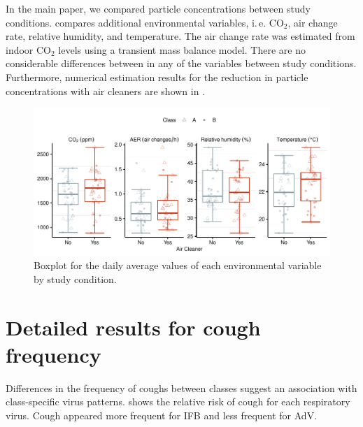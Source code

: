 \documentclass[fleqn,11pt]{wlscirep_supp}
\newcommand\ie{i.\,e.\xspace}
\begin{document}
In the main paper, we compared particle concentrations between study conditions.  compares additional environmental variables, \ie CO$_2$, air change rate, relative humidity, and temperature. The air change rate was estimated from indoor CO$_2$ levels using a transient mass balance model\cite{Batterman2017IJERPH}. There are no considerable differences between in any of the variables between study conditions. Furthermore, numerical estimation results for the reduction in particle concentrations with air cleaners are shown in .

\begin{figure}[!htb]
\centering
    \includegraphics[width=\linewidth]{../../results/env-data/otherVars-boxplot.pdf}
    \caption[Boxplot of environmental variables by study condition]{Boxplot for the daily average values of each environmental variable by study condition.}
    \label{fig:env-descriptives-other-vars}
\end{figure}

\clearpage

\section{Detailed results for cough frequency}\label{sec:detailed-results-coughing}

Differences in the frequency of coughs between classes suggest an association with class-specific virus patterns.  shows the relative risk of cough for each respiratory virus. Cough appeared more frequent for IFB and less frequent for AdV.  
\end{document}
